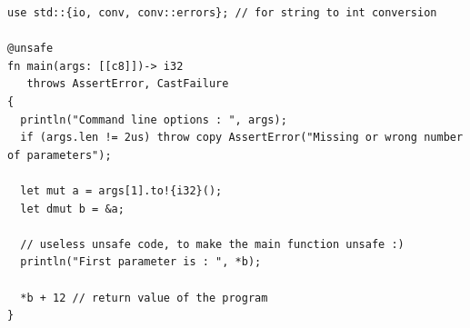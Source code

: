 \begin{lstlisting}[style=coloredverbatim, caption=The most complex main function prototype]
use std::{io, conv, conv::errors}; // for string to int conversion

@unsafe
fn main(args: [[c8]])-> i32
   throws AssertError, CastFailure
{
  println("Command line options : ", args);
  if (args.len != 2us) throw copy AssertError("Missing or wrong number of parameters");

  let mut a = args[1].to!{i32}();
  let dmut b = &a;

  // useless unsafe code, to make the main function unsafe :)
  println("First parameter is : ", *b);

  *b + 12 // return value of the program
}
\end{lstlisting}


\vfill%
\pagebreak
